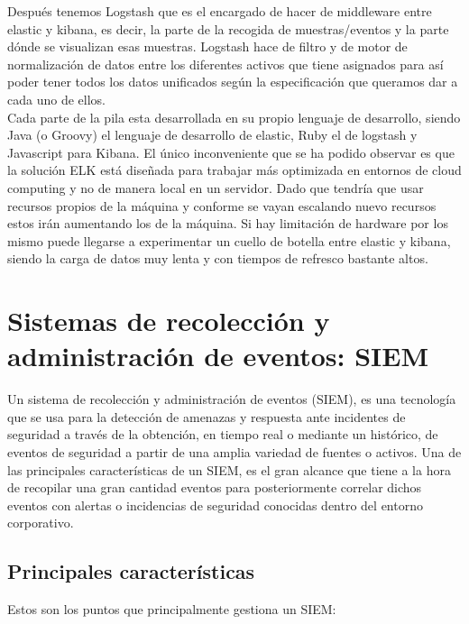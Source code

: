 Después tenemos Logstash que es el encargado de hacer de middleware entre elastic y kibana, es decir, la parte de la recogida de muestras/eventos y la parte dónde se visualizan esas muestras. Logstash hace de filtro y de motor de normalización de datos entre los diferentes activos que tiene asignados para así poder tener todos los datos unificados según la especificación que queramos dar a cada uno de ellos. \\

Cada parte de la pila esta desarrollada en su propio lenguaje de desarrollo, siendo Java (o Groovy) el lenguaje de desarrollo de elastic, Ruby el de logstash y Javascript para Kibana. El único inconveniente que se ha podido observar es que la solución ELK está diseñada para trabajar más optimizada en entornos de cloud computing y no de manera local en un servidor. Dado que tendría que usar recursos propios de la máquina y conforme se vayan escalando nuevo recursos estos irán aumentando los de la máquina. Si hay limitación de hardware por los mismo puede llegarse a experimentar un cuello de botella entre elastic y kibana, siendo la carga de datos muy lenta y con tiempos de refresco bastante altos. \\

\section[SIEM]{Sistemas de recolección y administración de eventos: SIEM}

Un sistema de recolección y administración de eventos (SIEM), es una tecnología que se usa para la detección de amenazas y respuesta ante incidentes de seguridad a través de la obtención, en tiempo real o mediante un histórico, de eventos de seguridad a partir de una amplia variedad de fuentes o activos. Una de las principales características de un SIEM, es el gran alcance que tiene a la hora de recopilar una gran cantidad eventos para posteriormente correlar dichos eventos con alertas o incidencias de seguridad conocidas dentro del entorno corporativo.\\

\subsection{Principales características}

Estos son los puntos que principalmente gestiona un SIEM:\\

